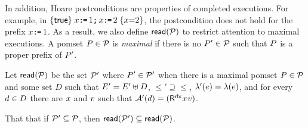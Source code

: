 In addition, Hoare postconditions are properties of completed executions.
For example, in $\{\mathsf{true}\}\allowbreak\;x\texttt{:}\mkern-1mu\texttt{=}\,1\texttt{;}\,\allowbreak x\texttt{:}\mkern-1mu\texttt{=}\,2\;\allowbreak\{x{=}2\}$, the postcondition
does not hold for the prefix $x\texttt{:}\mkern-1mu\texttt{=}\,1$.  As a result, we also define
${\mathsf{read}}(\mathcal{P})$ to restrict attention to maximal executions.  A pomset
$P\in\mathcal{P}$ is \emph{maximal} if there is no $P'\in\mathcal{P}$ such that
$P$ is a proper prefix of $P'$.


Let ${\mathsf{read}}(\mathcal{P})$ be the set $\mathcal{P}'$ where $P'\in\mathcal{P}'$ when there is
a maximal pomset $P\in\mathcal{P}$ and some set $D$ such that
$E'= E'\uplus D$, ${\le'} \supseteq{\le}$,
$\lambda'(e) = \lambda(e)$, and for every $d\in D$ there are
$x$ and $v$ such that
$\labelingAct'(\bEv)=(\DR[\modeRLX]{\aLoc}{\aVal})$.

That that if $\mathcal{P}'\subseteq\mathcal{P}$, then ${\mathsf{read}}(\mathcal{P}')\subseteq {\mathsf{read}}(\mathcal{P})$.

